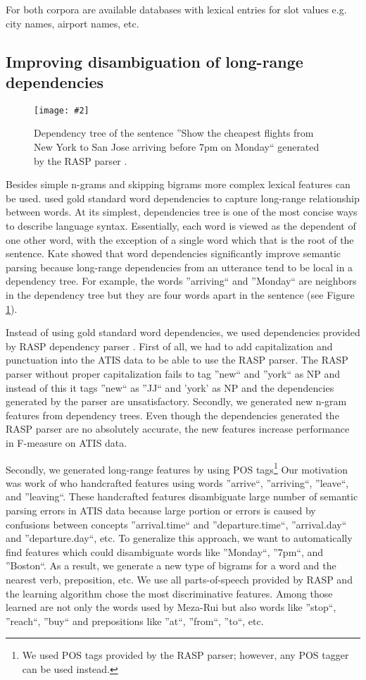 \documentclass[11pt]{article}
\newcommand{\fgrparam}[4]{
  \begin{figure}[htbp]
    \begin{center}
      \leavevmode
      \texttt{[image: \#2]}
    \end{center}
    \caption{#4}
    \label{#3}
  \end{figure}
}
\begin{document}
For both corpora are available databases with lexical entries for slot values e.g. city names, airport names, etc. 

\subsection{Improving disambiguation of long-range dependencies}

\fgrparam{width=8cm}{./fig/dep-tree.pdf}{fig:dep:tree}{Dependency tree of the sentence ''Show the cheapest flights from New York to San Jose arriving before 7pm on Monday`` generated by the RASP parser \cite{rasp06}.}

Besides simple n-grams and skipping bigrams more complex lexical features can be used. \cite{kate08} used gold standard word dependencies to capture long-range relationship between words. At its simplest, dependencies tree is one of the most concise ways to describe language syntax. Essentially, each word is viewed as the dependent of one other word, with the exception of a single word which that is the root of the sentence. Kate showed that word dependencies significantly improve semantic parsing because long-range dependencies from an utterance tend to be local in a dependency tree. For example, the words ''arriving`` and ''Monday`` are neighbors in the dependency tree but they are four words apart in the sentence (see Figure \ref{fig:dep:tree}).

Instead of using gold standard word dependencies, we used dependencies provided by RASP dependency parser \cite{rasp06}. First of all, we had to add capitalization and punctuation into the ATIS data to be able to use the RASP parser. The RASP parser without proper capitalization fails to tag ''new`` and ''york`` as NP and instead of this it tags ''new`` as ''JJ`` and 'york' as NP and the dependencies generated by the parser are unsatisfactory. Secondly, we generated new n-gram features from dependency trees. Even though the dependencies generated the RASP parser are no absolutely accurate, the new features increase performance in F-measure on ATIS data. 

Secondly, we generated long-range features by using POS tags\footnote{We used POS tags provided by the RASP parser; however, any POS tagger can be used instead.} 
Our motivation was work of \cite{meza08a,meza08b} who handcrafted features using words ''arrive``, ''arriving``, ''leave``, and ''leaving``. These handcrafted features disambiguate large number of semantic parsing errors in ATIS data because large portion or errors is caused by confusions between concepts ''arrival.time`` and ''departure.time``, ''arrival.day`` and ''departure.day``, etc. To generalize this approach, we want to automatically find features which could disambiguate words like ''Monday``, ''7pm``, and ''Boston``. As a result, we generate a new type of bigrams for a word and the nearest verb, preposition, etc. We use all parts-of-speech provided by RASP and the learning algorithm chose the most discriminative features. Among those learned are not only the words used by Meza-Rui but also words like ''stop``, ''reach``, ''buy`` and prepositions like ''at``, ''from``, ''to``, etc.
\end{document}
